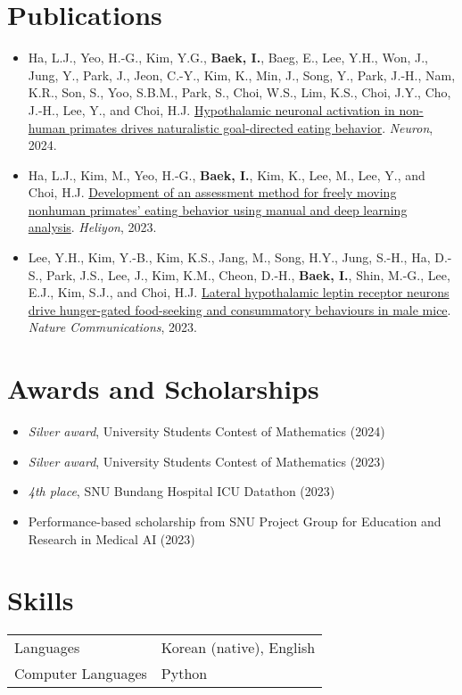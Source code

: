 \documentclass[10pt, a4paper]{article}
\newenvironment{customitemize}
	{\begin{itemize}[leftmargin=*, noitemsep, topsep=0pt, label=$\cdot$]}
	{\end{itemize}}
\begin{document}
\section*{Publications}
\begin{customitemize}
    \item Ha, L.J., Yeo, H.-G., Kim, Y.G., {\bf Baek, I.}, Baeg, E., Lee, Y.H., Won, J., Jung, Y., Park, J., Jeon, C.-Y., Kim, K., Min, J., Song, Y., Park, J.-H., Nam, K.R., Son, S., Yoo, S.B.M., Park, S., Choi, W.S., Lim, K.S., Choi, J.Y., Cho, J.-H., Lee, Y., and Choi, H.J. \href{https://doi.org/10.1016/j.neuron.2024.03.029}{Hypothalamic neuronal activation in non-human primates drives naturalistic goal-directed eating behavior}. {\it Neuron}, 2024. 
    \item Ha, L.J., Kim, M., Yeo, H.-G., {\bf Baek, I.}, Kim, K., Lee, M., Lee, Y., and Choi, H.J. \href{https://doi.org/10.1016/j.heliyon.2024.e25561}{Development of an assessment method for freely moving nonhuman primates' eating behavior using manual and deep learning analysis}. {\it Heliyon}, 2023. 
    \item Lee, Y.H., Kim, Y.-B., Kim, K.S., Jang, M., Song, H.Y., Jung, S.-H., Ha, D.-S., Park, J.S., Lee, J., Kim, K.M., Cheon, D.-H., {\bf Baek, I.}, Shin, M.-G., Lee, E.J., Kim, S.J., and Choi, H.J. \href{https://doi.org/10.1038/s41467-023-37044-4}{Lateral hypothalamic leptin receptor neurons drive hunger-gated food-seeking and consummatory behaviours in male mice}. {\it Nature Communications}, 2023. 
\end{customitemize}

\section*{Awards and Scholarships}
\begin{customitemize}
    \item \textit{Silver award}, University Students Contest of Mathematics (2024)
    \item \textit{Silver award}, University Students Contest of Mathematics (2023)
    \item \textit{4th place}, SNU Bundang Hospital ICU Datathon (2023)
    \item Performance-based scholarship from SNU Project Group for Education and Research in Medical AI (2023)
\end{customitemize}


\section*{Skills}
\begin{tabular}{ll}
    Languages & Korean (native), English \\
    Computer Languages & Python
\end{tabular}
\end{document}
